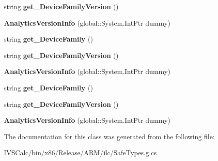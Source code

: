 \begin{DoxyCompactItemize}
\mbox{\label{class_windows_1_1_system_1_1_profile_1_1_analytics_version_info_ae1017f62f400e447ceec0f27569c0102}} 
string {\bfseries get\+\_\+\+Device\+Family\+Version} ()
\item 
\mbox{\label{class_windows_1_1_system_1_1_profile_1_1_analytics_version_info_ab8a16d6ac03137d9ea041bae96d013d4}} 
{\bfseries Analytics\+Version\+Info} (global\+::\+System.\+Int\+Ptr dummy)
\item 
\mbox{\label{class_windows_1_1_system_1_1_profile_1_1_analytics_version_info_a9f31a0b43a2aa8c5df99a0e04980f615}} 
string {\bfseries get\+\_\+\+Device\+Family} ()
\item 
\mbox{\label{class_windows_1_1_system_1_1_profile_1_1_analytics_version_info_ae1017f62f400e447ceec0f27569c0102}} 
string {\bfseries get\+\_\+\+Device\+Family\+Version} ()
\item 
\mbox{\label{class_windows_1_1_system_1_1_profile_1_1_analytics_version_info_ab8a16d6ac03137d9ea041bae96d013d4}} 
{\bfseries Analytics\+Version\+Info} (global\+::\+System.\+Int\+Ptr dummy)
\item 
\mbox{\label{class_windows_1_1_system_1_1_profile_1_1_analytics_version_info_a9f31a0b43a2aa8c5df99a0e04980f615}} 
string {\bfseries get\+\_\+\+Device\+Family} ()
\item 
\mbox{\label{class_windows_1_1_system_1_1_profile_1_1_analytics_version_info_ae1017f62f400e447ceec0f27569c0102}} 
string {\bfseries get\+\_\+\+Device\+Family\+Version} ()
\item 
\mbox{\label{class_windows_1_1_system_1_1_profile_1_1_analytics_version_info_ab8a16d6ac03137d9ea041bae96d013d4}} 
{\bfseries Analytics\+Version\+Info} (global\+::\+System.\+Int\+Ptr dummy)
\end{DoxyCompactItemize}


The documentation for this class was generated from the following file\+:\begin{DoxyCompactItemize}
\item 
I\+V\+S\+Calc/bin/x86/\+Release/\+A\+R\+M/ilc/Safe\+Types.\+g.\+cs\end{DoxyCompactItemize}
